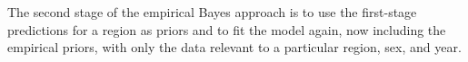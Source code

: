 The second stage of the empirical Bayes approach is to use the
first-stage predictions for a region as priors and to fit the model again,
now including the empirical priors, with only the data relevant to a
particular region, sex, and year.





